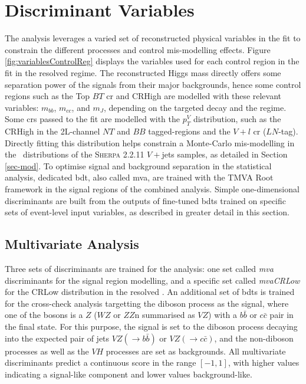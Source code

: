 \section{Discriminant Variables}\label{sec-vh-disc}
The analysis leverages a varied set of reconstructed physical variables in the fit to constrain the different processes and control mis-modelling effects. Figure \ref{fig:variablesControlReg} displays the variables used for each control region in the fit in the resolved regime. The reconstructed Higgs mass directly offers some separation power of the signals from their major backgrounds, hence some control regions such as the Top $BT$ \gls{cr} and CRHigh are modelled with these relevant variables: $m_{bb}$, $m_{cc}$, and $m_J$, depending on the targeted decay and the regime. Some \glspl{cr} passed to the fit are modelled with the $p_T^V$ distribution, such as the CRHigh in the 2L-channel $NT$ and $BB$ tagged-regions and the $V+l$ \gls{cr} ($LN$-tag). Directly fitting this distribution helps constrain a Monte-Carlo mis-modelling in the \ptv\ distributions of the \textsc{Sherpa} 2.2.11 $V+$jets samples, as detailed in Section \ref{sec-mod}. To optimise signal and background separation in the statistical analysis, dedicated \gls{bdt}, also called \gls{mva}, are trained with the \textsc{TMVA} Root framework \cite{Therhaag:2011jh} in the signal regions of the combined analysis. Simple one-dimensional discriminants are built from the outputs of fine-tuned \glspl{bdt} trained on specific sets of event-level input variables, as described in greater detail in this section. \\

\subsection{Multivariate Analysis}
Three sets of discriminants are trained for the analysis: one set called \textit{\gls{mva}} discriminants for the signal region modelling, and a specific set called \textit{mvaCRLow} for the CRLow distribution in the resolved \vhb. An additional set of \glspl{bdt} is trained for the cross-check analysis targetting the diboson process as the signal, where one of the bosons is a $Z$ ($WZ$ or $ZZ$n summarised as $VZ$) with a $b\bar{b}$ or $c\bar{c}$ pair in the final state. For this purpose, the signal is set to the diboson process decaying into the expected pair of jets $VZ(\rightarrow b\bar{b})$ or $VZ(\rightarrow c\bar{c})$, and the non-diboson processes as well as the $VH$ processes are set as backgrounds. All multivariate discriminants predict a continuous score in the range $[-1, 1]$, with higher values indicating a signal-like component and lower values background-like.

